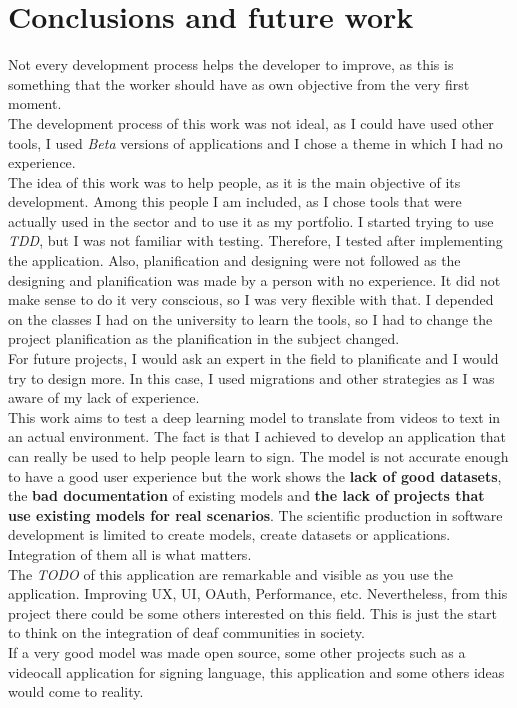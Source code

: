 \chapter{Conclusions and future work}



Not every development process helps the developer to improve, as this is something that the worker should have as own objective from the very first moment. \\

The development process of this work was not ideal, as I could have used other tools, I used \textit{Beta} versions of applications and I chose a theme in which I had no experience. \\
 
The idea of this work was to help people, as it is the main objective of its development. Among this people I am included, as I chose tools that were actually used in the sector and to use it as my portfolio. I started trying to use \textit{TDD}, but I was not familiar with testing. Therefore, I tested after implementing the application. Also, planification and designing were not followed as the designing and planification was made by a person with no experience. It did not make sense to do it very conscious, so I was very flexible with that. I depended on the classes I had on the university to learn the tools, so I had to change the project planification as the planification in the subject changed. \\

For future projects, I would ask an expert in the field to planificate and I would try to design more. In this case, I used migrations and other strategies as I was aware of my lack of experience. \\

This work aims to test a deep learning model to translate from videos to text in an actual environment. The fact is that I achieved to develop an application that can really be used to help people learn to sign. The model is not accurate enough to have a good user experience but the work shows the \textbf{lack of good datasets}, the \textbf{bad documentation} of existing models and \textbf{the lack of projects that use existing models for real scenarios}. The scientific production in software development is limited to create models, create datasets or applications. Integration of them all is what matters. \\

The \textit{TODO} of this application are remarkable and visible as you use the application. Improving UX, UI, OAuth, Performance, etc. Nevertheless, from this project there could be some others interested on this field. This is just the start to think on the integration of deaf communities in society. \\

If a very good model was made open source, some other projects such as a videocall application for signing language, this application and some others ideas would come to reality.